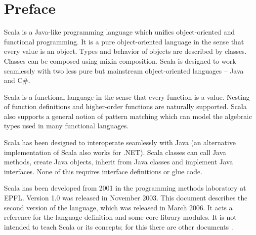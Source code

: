 \renewcommand{\todo}[1]{}
\newcommand{\notyet}[1]{\footnote{#1 not yet implemented.}}
\newcommand{\Ts}{\mbox{\sl Ts}}
\newcommand{\tps}{\mbox{\sl tps}}
\newcommand{\ps}{\mbox{\sl ps}}
\newcommand{\ds}{\mbox{\sl ds}}
\newcommand{\xs}{\mbox{\sl xs}}
\newcommand{\psig}{\mbox{\sl psig}}
\newcommand{\fsig}{\mbox{\sl fsig}}
\newcommand{\csig}{\mbox{\sl csig}}
\newcommand{\args}{\mbox{\sl args}}
\newcommand{\targs}{\mbox{\sl targs}}
\newcommand{\enums}{\mbox{\sl enums}}
\newcommand{\proto}{\mbox{\sl pt}}
\newcommand{\argtypes}{\mbox{\sl Ts}}
\newcommand{\stats}{\mbox{\sl stats}}
\newcommand{\overload}{\la\mbox{\sf and}\ra}
\newcommand{\op}{\mbox{\sl op}}

\newcommand{\eqdef}{\stackrel{\mbox{\small eq}}{=}}
\newcommand{\ifqualified}[1]{}
\newcommand{\iflet}[1]{}
\newcommand{\ifundefvar}[1]{}
\newcommand{\iffinaltype}[1]{}
\newcommand{\ifpackaging}[1]{}
\newcommand{\ifnewfor}[1]{}

\newcommand{\U}[1]{\mbox{$\backslash$u{#1}}}
\newcommand{\Urange}[2]{\mbox{$\backslash$u{#1}-$\backslash$u{#2}}}

\section*{Preface}

Scala is a Java-like programming language which unifies
object-oriented and functional programming.  It is a pure
object-oriented language in the sense that every value is an
object. Types and behavior of objects are described by
classes. Classes can be composed using mixin composition.  Scala is
designed to work seamlessly with two less pure but mainstream
object-oriented languages -- Java and C\#.

Scala is a functional language in the sense that every function is a
value. Nesting of function definitions and higher-order functions are
naturally supported. Scala also supports a general notion of pattern
matching which can model the algebraic types used in many functional
languages.

Scala has been designed to interoperate seamlessly with Java (an
alternative implementation of Scala also works for .NET). Scala
classes can call Java methods, create Java objects, inherit from Java
classes and implement Java interfaces. None of this requires interface
definitions or glue code.

Scala has been developed from 2001 in the programming methods
laboratory at EPFL. Version 1.0 was released in November 2003. This
document describes the second version of the language, which was
released in March 2006. It acts a reference for the language
definition and some core library modules. It is not intended to teach
Scala or its concepts; for this there are other documents 
\cite{scala-overview-tech-report,%
      odersky:scala-experiment,%
      odersky:sca,%
      odersky-et-al:ecoop03,%
      odersky-zenger:fool12}.

